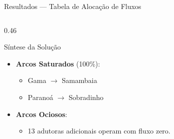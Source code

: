 \begin{frame}{Resultados --- Tabela de Alocação de Fluxos}
\begin{columns}[t]
\begin{column}{0.46\textwidth}
\begin{block}{Síntese da Solução}
\begin{itemize}
          \item \textbf{Arcos Saturados} (100\%):
          \begin{itemize}
            \tiny
            \item Gama $\rightarrow$ Samambaia
            \item Paranoá $\rightarrow$ Sobradinho
          \end{itemize}
          \item \textbf{Arcos Ociosos}:
          \begin{itemize}
            \tiny
            \item 13 adutoras adicionais operam com fluxo zero.
          \end{itemize}
        \end{itemize}
      \end{block}
    \end{column}
  \end{columns}
\end{frame}

